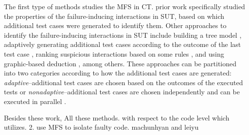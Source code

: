 \documentclass{sig-alternate-05-2015}
\begin{document}
The first type of methods studies the MFS in CT. prior work \cite{nie2011minimal} specifically studied the properties of the failure-inducing interactions in SUT, based on which additional test cases were generated to identify them. Other approaches to identify the failure-inducing interactions in SUT include building a tree model \cite{yilmaz2006covering}, adaptively generating additional test cases according to the outcome of the last test case \cite{zhang2011characterizing}, ranking suspicious interactions based on some rules \cite{ghandehari2012identifying}, and using graphic-based deduction \cite{martinez2008algorithms}, among others. These approaches can be partitioned into two categories \cite{colbourn2008locating} according to how the additional test cases are generated: \emph{adaptive}--additional test cases are chosen based on the outcomes of the executed tests \cite{shi2005software,nie2011minimal,ghandehari2012identifying,niu2013identifying,zhang2011characterizing,shakya2012isolating,wang2010adaptive,li2012improved}or \emph{nonadaptive}--additional test cases are chosen independently and can be executed in parallel \cite{yilmaz2006covering,colbourn2008locating,martinez2008algorithms,martinez2009locating,zhang2012faulty}.

Besides these work, All these methods. with respect to the code level which utilizes.
2. use MFS to isolate faulty code. machunhyan \cite{ma2013locating}  and leiyu \cite{ghandehari2013fault}
\end{document}
